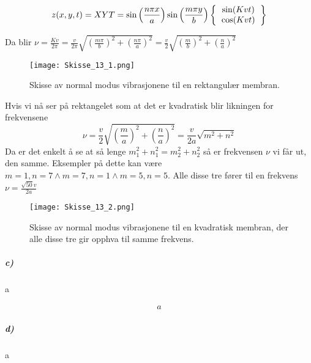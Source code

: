 \documentclass[11pt, A4paper,norsk]{article}
\begin{document}
				\begin{gather*}
z(x, y, t) = X Y T = \sin\left( \frac{n \pi x}{a} \right) \sin\left( \frac{m \pi y}{b} \right) \left\{
\begin{tabular}{ c }
	$\sin(Kv t)$ \\
	$\cos(Kv t)$
\end{tabular}
\right\}
				\end{gather*}
				\begin{flushleft}
Da blir $\nu = \frac{K v}{2 \pi} = \frac{v}{2 \pi} \sqrt{\left( \frac{m \pi}{b} \right)^2 + \left( \frac{n \pi}{a} \right)^2} = \frac{v}{2} \sqrt{\left( \frac{m}{b} \right)^2 + \left( \frac{n}{a} \right)^2}$
				\end{flushleft}
				\begin{figure}[H]
\texttt{[image: Skisse\_13\_1.png]}
\caption{Skisse av normal modus vibrasjonene til en rektangulær membran.}
				\end{figure}
				\begin{flushleft}
Hvis vi nå ser på rektangelet som at det er kvadratisk blir likningen for frekvensene
$$\nu = \frac{v}{2} \sqrt{\left( \frac{m}{a} \right)^2 + \left( \frac{n}{a} \right)^2} = \frac{v}{2a} \sqrt{m^2 + n^2}$$
Da er det enkelt å se at så lenge $m_1^2 + n_1^2 = m_2^2 + n_2^2$ så er frekvensen $\nu$ vi får ut, den samme. Eksempler på dette kan være $m = 1, n = 7 \wedge m = 7, n = 1 \wedge m = 5, n = 5$. Alle disse tre fører til en frekvens $\nu = \frac{\sqrt{50} v}{2 a}$
				\end{flushleft}
				\begin{figure}[H]
\texttt{[image: Skisse\_13\_2.png]}
\caption{Skisse av normal modus vibrasjonene til en kvadratisk membran, der alle disse tre gir opphva til samme frekvens.}
				\end{figure}







			\subparagraph{c)}
				\begin{flushleft}
a
				\end{flushleft}
				\begin{gather}
a
				\end{gather}
			









			\subparagraph{d)}
				\begin{flushleft}
a
				\end{flushleft}
\end{document}

